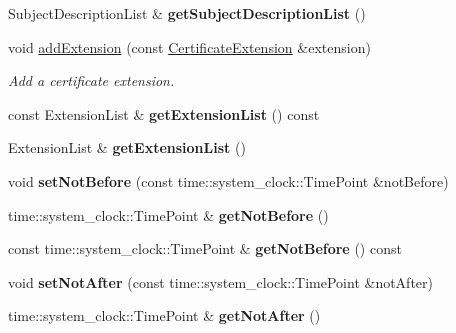 \begin{DoxyCompactItemize}
\item 
Subject\+Description\+List \& {\bfseries get\+Subject\+Description\+List} ()\hypertarget{classndn_1_1Certificate_ae0d492603af28090cf6fe2904840ca5c}{}\label{classndn_1_1Certificate_ae0d492603af28090cf6fe2904840ca5c}

\item 
void \hyperlink{classndn_1_1Certificate_acad3bff7836bdbaf6be4f6e472b4f796}{add\+Extension} (const \hyperlink{classndn_1_1CertificateExtension}{Certificate\+Extension} \&extension)
\begin{DoxyCompactList}\small\item\em Add a certificate extension. \end{DoxyCompactList}\item 
const Extension\+List \& {\bfseries get\+Extension\+List} () const\hypertarget{classndn_1_1Certificate_ac9ff65f2655cedd275785d1fe3748754}{}\label{classndn_1_1Certificate_ac9ff65f2655cedd275785d1fe3748754}

\item 
Extension\+List \& {\bfseries get\+Extension\+List} ()\hypertarget{classndn_1_1Certificate_a8e123c4f106c7fa19f983abf28e01c23}{}\label{classndn_1_1Certificate_a8e123c4f106c7fa19f983abf28e01c23}

\item 
void {\bfseries set\+Not\+Before} (const time\+::system\+\_\+clock\+::\+Time\+Point \&not\+Before)\hypertarget{classndn_1_1Certificate_af31beee0c8f6b06b1d6d70ca8065df68}{}\label{classndn_1_1Certificate_af31beee0c8f6b06b1d6d70ca8065df68}

\item 
time\+::system\+\_\+clock\+::\+Time\+Point \& {\bfseries get\+Not\+Before} ()\hypertarget{classndn_1_1Certificate_abd294a902a2f1c77f968929a480e62e2}{}\label{classndn_1_1Certificate_abd294a902a2f1c77f968929a480e62e2}

\item 
const time\+::system\+\_\+clock\+::\+Time\+Point \& {\bfseries get\+Not\+Before} () const\hypertarget{classndn_1_1Certificate_a9cda75ff9b9bac5e236018938bee57a2}{}\label{classndn_1_1Certificate_a9cda75ff9b9bac5e236018938bee57a2}

\item 
void {\bfseries set\+Not\+After} (const time\+::system\+\_\+clock\+::\+Time\+Point \&not\+After)\hypertarget{classndn_1_1Certificate_a8eebd2514d5b5c8c1cf91cf25b64b6a5}{}\label{classndn_1_1Certificate_a8eebd2514d5b5c8c1cf91cf25b64b6a5}

\item 
time\+::system\+\_\+clock\+::\+Time\+Point \& {\bfseries get\+Not\+After} ()\hypertarget{classndn_1_1Certificate_a08d15e501978146e66bbbe0f357d4c27}{}\label{classndn_1_1Certificate_a08d15e501978146e66bbbe0f357d4c27}


\end{DoxyCompactItemize}
